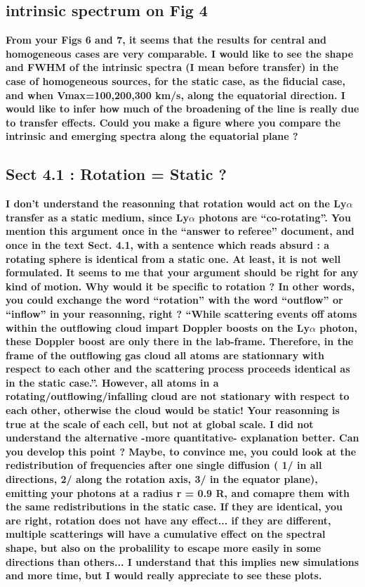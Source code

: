 \documentclass[12pt]{article}
\begin{document}
\subsection*{intrinsic spectrum on Fig 4}

{\bf From your Figs 6 and 7, it seems that the results for central and homogeneous cases are very comparable. I would like to see the shape and FWHM of the intrinsic spectra (I mean before transfer) in the case of homogeneous sources, for the static case, as the fiducial case, and when Vmax=100,200,300 km/s, along the equatorial direction. I would like to infer how much of the broadening of the line is really due to transfer effects. Could you make a figure where you compare the intrinsic and emerging spectra along
the equatorial plane ?}

\subsection*{Sect 4.1 : Rotation = Static ?}

{\bf I don’t understand the reasonning that rotation would act on the Ly$\alpha$ transfer as a static medium, since Ly$\alpha$ photons are “co-rotating”. You mention this argument once in the “answer to referee” document, and once in the text Sect. 4.1, with a sentence which reads absurd : a rotating sphere is identical from a static one. At least, it is not well formulated.
It seems to me that your argument should be right for any kind of motion. Why would it be specific to rotation ? In other words, you could exchange the word “rotation” with the word “outflow” or “inflow” in your reasonning, right ? “While scattering events off atoms within the outflowing cloud impart Doppler boosts on the Ly$\alpha$ photon, these Doppler boost are only there in the lab-frame. Therefore, in the frame of the outflowing gas cloud all atoms are stationnary with respect to each other and the scattering process proceeds identical as in the static case.”. However, all atoms in a rotating/outflowing/infalling cloud are not stationary with respect to each other, otherwise the cloud would be static! Your reasonning is true at the scale of each cell, but not at global scale.
I did not understand the alternative -more quantitative- explanation better.
Can you develop this point ? Maybe, to convince me, you could look at the redistribution of frequencies after one single diffusion ( 1/ in all directions, 2/ along the rotation axis, 3/ in the equator plane), emitting your photons at a radius r = 0.9 R, and comapre them with the same redistributions in the static case. If they are identical, you are right, rotation does not have any effect... if they are different, multiple scatterings will have a cumulative effect on the spectral shape, but also on the probalility to escape more easily in some directions than others... I understand that this implies new simulations and more time, but I would really appreciate to see these plots. } 
\end{document}
